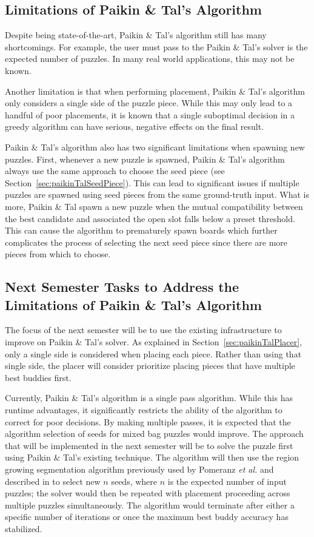 \documentclass{report}
\begin{document}
\subsection{Limitations of Paikin \& Tal's Algorithm}\label{sec:paikinTalLimitations}

Despite being state-of-the-art, Paikin \& Tal's algorithm still has many shortcomings.  For example, the user must pass to the Paikin \& Tal's solver is the expected number of puzzles.  In many real world applications, this may not be known.

Another limitation is that when performing placement, Paikin \& Tal's algorithm only considers a single side of the puzzle piece.  While this may only lead to a handful of poor placements, it is known that a single suboptimal decision in a greedy algorithm can have serious, negative effects on the final result.  

Paikin \& Tal's algorithm also has two significant limitations when spawning new puzzles. First, whenever a new puzzle is spawned, Paikin \& Tal's algorithm always use the same approach to choose the seed piece (see Section~\ref{sec:paikinTalSeedPiece}).  This can lead to significant issues if multiple puzzles are spawned using seed pieces from the same ground-truth input.  What is more, Paikin \& Tal spawn a new puzzle when the mutual compatibility between the best candidate and associated the open slot falls below a preset threshold.  This can cause the algorithm to prematurely spawn boards which further complicates the process of selecting the next seed piece since there are more pieces from which to choose.

\subsection{Next Semester Tasks to Address the Limitations of Paikin \& Tal's Algorithm}\label{sec:nextSemesterTasks}

The focus of the next semester will be to use the existing infrastructure to improve on Paikin \& Tal's solver.  As explained in Section~\ref{sec:paikinTalPlacer}, only a single side is considered when placing each piece.  Rather than using that single side, the placer will consider prioritize placing pieces that have multiple best buddies first.  

Currently, Paikin \& Tal's algorithm is a single pass algorithm.  While this has runtime advantages, it significantly restricts the ability of the algorithm to correct for poor decisions.  By making multiple passes, it is expected that the algorithm selection of seeds for mixed bag puzzles would improve.  The approach that will be implemented in the next semester will be to solve the puzzle first using Paikin \& Tal's existing technique.  The algorithm will then use the region growing segmentation algorithm previously used by Pomeranz \textit{et al.} and described in \cite{pitas} to select new $n$ seeds, where $n$ is the expected number of input puzzles; the solver would then be repeated with placement proceeding across multiple puzzles simultaneously.  The algorithm would terminate after either a specific number of iterations or once the maximum best buddy accuracy has stabilized.
\end{document}
